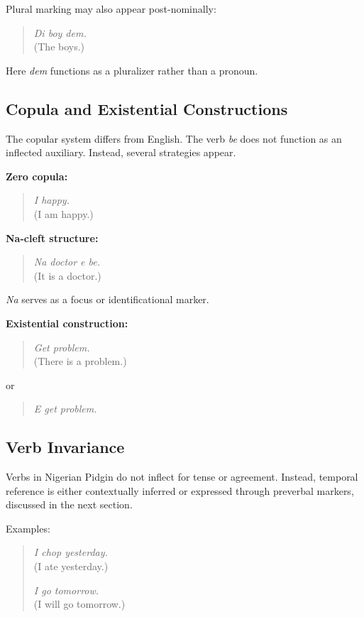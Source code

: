 \documentclass[12pt]{article}
\begin{document}
Plural marking may also appear post-nominally:

\begin{quote}
\textit{Di boy dem.} \\
(The boys.)
\end{quote}

Here \textit{dem} functions as a pluralizer rather than a pronoun.

\subsection{Copula and Existential Constructions}

The copular system differs from English. The verb \textit{be} does not function as an inflected auxiliary. Instead, several strategies appear.

\textbf{Zero copula:}

\begin{quote}
\textit{I happy.} \\
(I am happy.)
\end{quote}

\textbf{Na-cleft structure:}

\begin{quote}
\textit{Na doctor e be.} \\
(It is a doctor.)
\end{quote}

\textit{Na} serves as a focus or identificational marker.

\textbf{Existential construction:}

\begin{quote}
\textit{Get problem.} \\
(There is a problem.)
\end{quote}

or

\begin{quote}
\textit{E get problem.}
\end{quote}

\subsection{Verb Invariance}

Verbs in Nigerian Pidgin do not inflect for tense or agreement. Instead, temporal reference is either contextually inferred or expressed through preverbal markers, discussed in the next section.

Examples:

\begin{quote}
\textit{I chop yesterday.} \\
(I ate yesterday.)

\textit{I go tomorrow.} \\
(I will go tomorrow.)
\end{quote}
\end{document}

